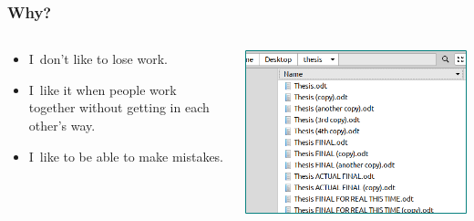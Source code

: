 \documentclass[12pt]{beamer}
\begin{document}
\begin{frame}
  \frametitle{Why?}

  \begin{columns}
    \begin{column}{.5\textwidth}
      \begin{itemize}
        \item I~don't like to lose work.
        \item I~like it when people work together without getting in each other's
          way.
        \item I~like to be able to make mistakes.
      \end{itemize}
    \end{column}

    \begin{column}{.5\textwidth}
      \includegraphics[width=\textwidth]{images/backups.png}%
    \end{column}
  \end{columns}
\end{frame}
\end{document}
